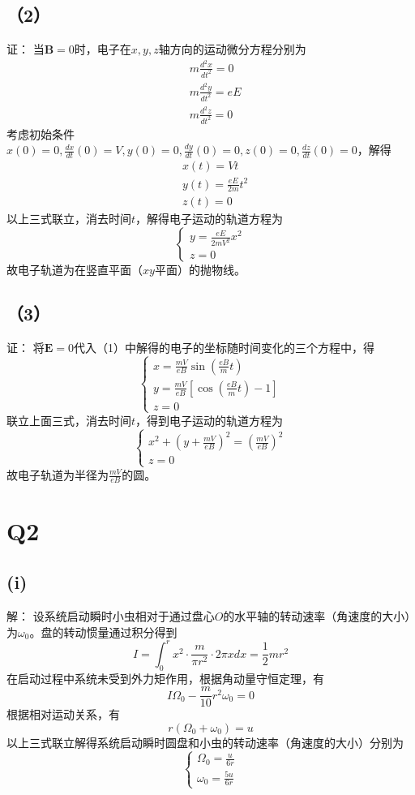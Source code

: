 \documentclass[10pt,a4paper]{article}
\theoremstyle{remark}
\begin{document}
\subsection*{（2）}证：
当$\textbf{B} = 0$时，电子在$x,y,z$轴方向的运动微分方程分别为
\begin{align*}
&m\frac{d^2x}{{dt}^2} = 0\\
&m\frac{d^2y}{{dt}^2} = eE\\
&m\frac{d^2z}{{dt}^2} = 0
\end{align*}
考虑初始条件$x(0) = 0,\frac{dx}{dt}(0) = V,y(0) = 0,\frac{dy}{dt}(0) = 0,z(0) = 0,\frac{dz}{dt}(0) = 0$，解得
\begin{align*}
&x(t) = Vt\\
&y(t) = \frac{eE}{2m}t^2\\
&z(t) = 0
\end{align*}
以上三式联立，消去时间$t$，解得电子运动的轨道方程为
\[
\left\{\begin{array}{l}
y = \frac{eE}{2mV^2}x^2\\
z = 0
\end{array}\right.
\]
故电子轨道为在竖直平面（$xy$平面）的抛物线。
\subsection*{（3）}证：
将$\textbf{E} = 0$代入（1）中解得的电子的坐标随时间变化的三个方程中，得
\[
\left\{\begin{array}{l}
x = \frac{mV}{eB}\sin(\frac{eB}{m}t)\\
y = \frac{mV}{eB}[\cos(\frac{eB}{m}t) - 1]\\
z = 0
\end{array}\right.
\]
联立上面三式，消去时间$t$，得到电子运动的轨道方程为
\[
\left\{\begin{array}{l}
x^2 + (y + \frac{mV}{eB})^2 = (\frac{mV}{eB})^2\\
z = 0
\end{array}\right.
\]
故电子轨道为半径为$\frac{mV}{eB}$的圆。
\section*{Q2}
\subsection*{(i)}解：
设系统启动瞬时小虫相对于通过盘心$O$的水平轴的转动速率（角速度的大小）为$\omega_0$。盘的转动惯量通过积分得到
\[
I = \int_0^rx^2\cdot\frac{m}{\pi r^2}\cdot2\pi xdx = \frac{1}{2}mr^2
\]
在启动过程中系统未受到外力矩作用，根据角动量守恒定理，有
\[
I\Omega_0 - \frac{m}{10}r^2\omega_0 = 0
\]
根据相对运动关系，有
\[
r(\Omega_0 + \omega_0) = u
\]
以上三式联立解得系统启动瞬时圆盘和小虫的转动速率（角速度的大小）分别为
\[
\left\{\begin{array}{l}
\Omega_0 = \frac{u}{6r}\\
\omega_0 = \frac{5u}{6r}
\end{array}\right.
\]
\end{document}
